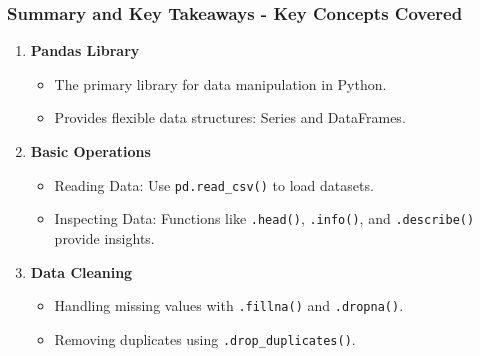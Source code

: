 \documentclass[aspectratio=169]{beamer}
\begin{document}
\begin{frame}[fragile]
    \frametitle{Summary and Key Takeaways - Key Concepts Covered}
    \begin{enumerate}
        \item \textbf{Pandas Library}
        \begin{itemize}
            \item The primary library for data manipulation in Python.
            \item Provides flexible data structures: Series and DataFrames.
        \end{itemize}
        
        \item \textbf{Basic Operations}
        \begin{itemize}
            \item Reading Data: Use \texttt{pd.read\_csv()} to load datasets.
            \item Inspecting Data: Functions like \texttt{.head()}, \texttt{.info()}, and \texttt{.describe()} provide insights.
        \end{itemize}
        
        \item \textbf{Data Cleaning}
        \begin{itemize}
            \item Handling missing values with \texttt{.fillna()} and \texttt{.dropna()}.
            \item Removing duplicates using \texttt{.drop\_duplicates()}.
        \end{itemize}
    \end{enumerate}
\end{frame}
\end{document}
